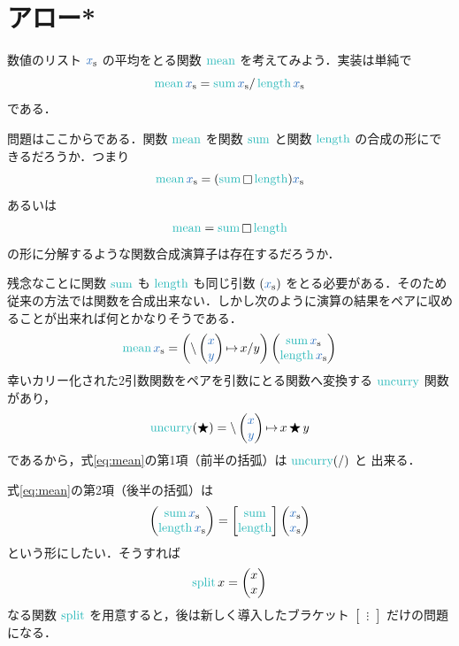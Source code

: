 \documentclass[a5paper,twoside,fleqn,draft]{jsbook}
\def\varColor{NavyBlue}
\def\funcColor{BlueGreen}
\newcommand{\mVar}[1]{\textcolor{\varColor}{#1}}
\newcommand{\mXVar}{\mVar{x}}
\newcommand{\mYVar}{\mVar{y}}
\newcommand{\mSpecialFunc}[1]{\textcolor{\funcColor}{\textrm{#1}}}
\DeclareMathOperator{\mLength}{\mSpecialFunc{length}}
\DeclareMathOperator{\mMean}{\mSpecialFunc{mean}}
\DeclareMathOperator{\mSplit}{\mSpecialFunc{split}}
\DeclareMathOperator{\mSum}{\mSpecialFunc{sum}}
\DeclareMathOperator{\mUncurry}{\mSpecialFunc{uncurry}}
\DeclareMathOperator{\mBinOp}{\bigstar}
\DeclareMathOperator{\mLambda}{\backslash}
\DeclareMathOperator{\mLambdaArrow}{\mapsto}
\DeclareMathOperator{\mSomeOp}{\square}
\newcommand{\mPairWith}[2]{\begin{pmatrix}#1\\#2\end{pmatrix}}
\newcommand{\mList}[1]{\mVar{#1}_\mathrm{s}}
\begin{document}
\section{アロー*}

数値のリスト $\mList{x}$ の平均をとる関数 $\mMean$ を考えてみよう．実装は単純で
\begin{equation}
  \mMean\mList{x}
  =\mSum\mList{x}/\mLength\mList{x}
\end{equation}
である．

問題はここからである．関数 $\mMean$ を関数 $\mSum$ と関数 $\mLength$ の合成の形にできるだろうか．つまり
\begin{equation}
  \mMean\mList{x}
  =(\mSum\mSomeOp\mLength)\mList{x}
\end{equation}
あるいは
\begin{equation}
  \mMean
  =\mSum\mSomeOp\mLength
\end{equation}
の形に分解するような関数合成演算子は存在するだろうか．

残念なことに関数 $\mSum$ も $\mLength$ も同じ引数 $(\mList{x})$ をとる必要がある．そのため従来の方法では関数を合成出来ない．しかし次のように演算の結果をペアに収めることが出来れば何とかなりそうである．
\begin{equation}
  \label{eq:mean}
  \mMean\mList{x}
  =
  \left(\mLambda\mPairWith{\mXVar}{\mYVar}\mLambdaArrow x/y\right)\mPairWith{\mSum\mList{x}}{\mLength\mList{x}}
\end{equation}
幸いカリー化された2引数関数をペアを引数にとる関数へ変換する
$\mUncurry$ 関数があり，
\begin{equation}
  \mUncurry(\mBinOp)
  =\mLambda\mPairWith{\mXVar}{\mYVar}\mLambdaArrow x\mBinOp y
\end{equation}
であるから，式\eqref{eq:mean}の第1項（前半の括弧）は $\mUncurry(/)$ と
出来る．

式\eqref{eq:mean}の第2項（後半の括弧）は
\begin{equation}
  \mPairWith{\mSum\mList{x}}{\mLength\mList{x}}
  =\begin{bmatrix}
  \mSum\\
  \mLength
  \end{bmatrix}
  \mPairWith{\mList{x}}{\mList{x}}
\end{equation}
という形にしたい．そうすれば
\begin{equation}
  \mSplit x
  =\mPairWith{x}{x}
\end{equation}
なる関数 $\mSplit$ を用意すると，後は新しく導入したブラケット
$\begin{bmatrix}\vdots\end{bmatrix}$ だけの問題になる．
\end{document}
